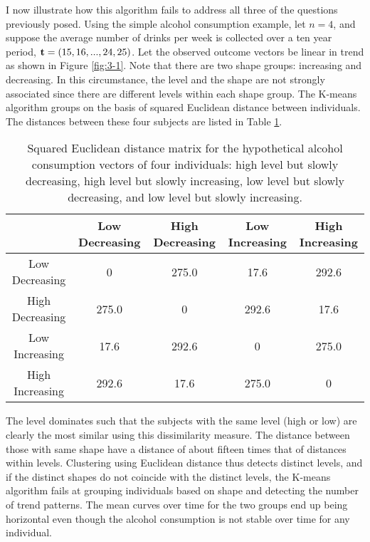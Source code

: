 I now illustrate how this algorithm fails to address all three of the questions previously posed. Using the simple alcohol consumption example, let $n=4$, and suppose the average number of drinks per week is collected over a ten year period, $\mathbf t=(15,16,...,24,25)$. Let the observed outcome vectors be linear in trend as shown in Figure \ref{fig:3-1}. Note that there are two shape groups: increasing and decreasing. In this circumstance, the level and the shape are not strongly associated since there are different levels within each shape group. The K-means algorithm groups on the basis of squared Euclidean distance between individuals. The distances between these four subjects are listed in Table \ref{tab:3-1}. 
\begin{table}[ht]
\centering
\begin{tabular}{c|cccc}
&Low Decreasing& High Decreasing&Low Increasing&High Increasing\\
\hline
Low Decreasing&0&275.0&17.6&292.6\\
High Decreasing&275.0  &0 &  292.6 &17.6 \\                     
Low Increasing& 17.6 &292.6  &0   &275.0   \\          
High Increasing& 292.6 &17.6 &275.0   &0 
\end{tabular}
\caption{Squared Euclidean distance matrix for the hypothetical alcohol consumption vectors of four individuals: high level but slowly decreasing, high level but slowly increasing, low level but slowly decreasing, and low level but slowly increasing. }
\label{tab:3-1}
\end{table}

The level dominates such that the subjects with the same level (high or low) are clearly the most similar using this dissimilarity measure. The distance between those with same shape have a distance of about fifteen times that of distances within levels. Clustering using Euclidean distance thus detects distinct levels, and if the distinct shapes do not coincide with the distinct levels, the K-means algorithm fails at grouping individuals based on shape and detecting the number of trend patterns. The mean curves over time for the two groups end up being horizontal even though the alcohol consumption is not stable over time for any individual.

